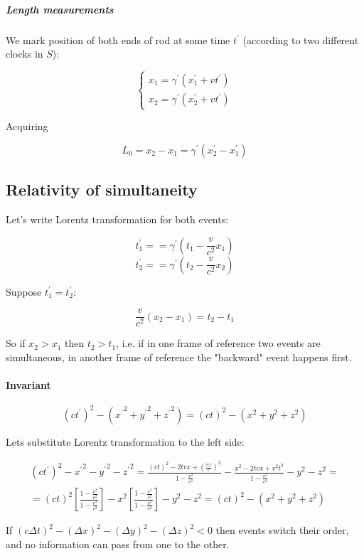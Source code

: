 \subparagraph{Length measurements} We mark position of both ends of rod at some time $t^\prime$ (according to two different clocks in $S$):

$$\begin{cases*}
	x_1 = \gamma^\prime\left( x_1^\prime + vt^\prime \right)\\
	x_2 = \gamma^\prime\left( x_2^\prime + vt^\prime \right)
\end{cases*}$$

Acquiring

$$L_0 = x_2 - x_1 = \gamma^\prime \left( x_2^\prime - x_1^\prime \right)$$

\subsection{Relativity of simultaneity}
Let's write Lorentz transformation for both events:

$$t_1^\prime = =\gamma^\prime \left( t_1 - \frac{v}{c^2}x_1 \right)$$
$$t_2^\prime = =\gamma^\prime \left( t_2 - \frac{v}{c^2}x_2 \right)$$

Suppose $t_1^\prime = t_2^\prime$:

$$ \frac{v}{c^2}\left(x_2 - x_1\right) = t_2 - t_1 $$

So if $x_2>x_1$ then $t_2>t_1$, i.e. if in one frame of reference two events are simultaneous, in another frame of reference the "backward" event happens first.

\paragraph{Invariant}

$$\left(ct^\prime\right)^2 - \left({x^\prime}^2+{y^\prime}^2+{z^\prime}^2\right)=\left(ct \right)^2 - \left(x^2+y^2+z^2\right)$$

Lets substitute Lorentz transformation to the left side:

\begin{align*}
\left(ct^\prime\right)^2 - {x^\prime}^2 - {y^\prime}^2 - {z^\prime}^2 = \frac{\left(ct\right)^2 - 2tvx + \left(\frac{vx}{c}\right)^2}{1-\frac{v^2}{c^2}} - \frac{x^2 - 2tvx + v^2t^2}{1-\frac{v^2}{c^2}} - y^2-z^2 =\\= \left(ct\right)^2 \left[ \frac{1-\frac{v^2}{c^2}}{1-\frac{v^2}{c^2}} \right] - x^2\left[ \frac{1-\frac{v^2}{c^2}}{1-\frac{v^2}{c^2}} \right] - y^2 - z^2 = \left(ct \right)^2 - \left(x^2+y^2+z^2\right)
\end{align*}

If $\left(c\Delta t\right)^2 - \left(\Delta x\right)^2 - \left(\Delta y\right)^2 - \left(\Delta z\right)^2 < 0$ then events switch their order, and no information can pass from one to the other.